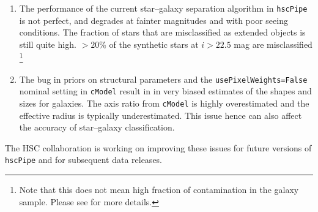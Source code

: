 \documentclass[useamsfonts]{pasj01}
\def\hscpipe{\texttt{hscPipe}}
\def\cmodel{\texttt{cModel}}
\begin{document}
    \begin{enumerate}

        \item The performance of the current star--galaxy separation algorithm in 
            \hscpipe{} is not perfect, and degrades at fainter magnitudes and with 
            poor seeing conditions.
            The fraction of stars that are misclassified as extended objects is still
            quite high. 
            $>20$\% of the synthetic stars at $i> 22.5$ mag are misclassified
            \footnote{Note that this does not mean high fraction of contamination 
            in the galaxy sample. Please see \citet{Bosch2017} for more 
            details.}

        \item The bug in priors on structural parameters and the 
            \texttt{usePixelWeights=False} nominal setting in \cmodel{} result in         
            in very biased estimates of the shapes and sizes for galaxies. 
            The axis ratio from \cmodel{} is highly overestimated and the effective 
            radius is typically underestimated.  
            This issue hence can also affect the accuracy of star--galaxy 
            classification.

    \end{enumerate}

    The HSC collaboration is working on improving these issues for future versions
    of \hscpipe{} and for subsequent data releases.  
    
\end{document}
